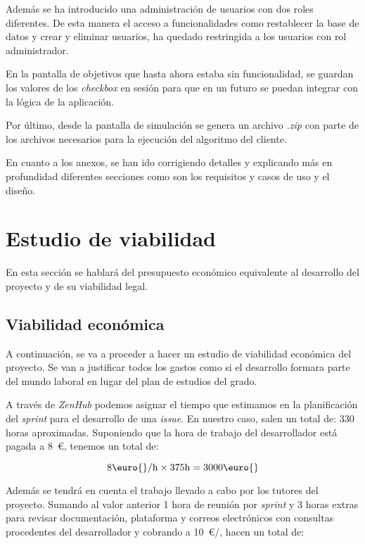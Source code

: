 Además se ha introducido una administración de usuarios con dos roles diferentes. De esta manera el acceso a funcionalidades como restablecer la base de datos y crear y eliminar usuarios, ha quedado restringida a los usuarios con rol administrador.

En la pantalla de objetivos que hasta ahora estaba sin funcionalidad, se guardan los valores de los \textit{checkbox} en sesión para que en un futuro se puedan integrar con la lógica de la aplicación.

Por último, desde la pantalla de simulación se genera un archivo \textit{.zip} con parte de los archivos necesarios para la ejecución del algoritmo del cliente.

En cuanto a los anexos, se han ido corrigiendo detalles y explicando más en profundidad diferentes secciones como son los requisitos y casos de uso y el diseño.

\section{Estudio de viabilidad}

En esta sección se hablará del presupuesto económico equivalente al desarrollo del proyecto y de su viabilidad legal.

\subsection{Viabilidad económica}

A continuación, se va a proceder a hacer un estudio de viabilidad económica del proyecto. Se van a justificar todos los gastos como si el desarrollo formara parte del mundo laboral en lugar del plan de estudios del grado.

A través de \textit{ZenHub} podemos asignar el tiempo que estimamos en la planificación del \textit{sprint} para el desarrollo de una \textit{issue}. En nuestro caso, salen un total de: 330 horas aproximadas. Suponiendo que la hora de trabajo del desarrollador está pagada a 8~\euro{}, tenemos un total de:

\[8\text{\euro{}}/\text{h}\times 375\text{h}=3000\text{\euro{}} \]

Además se tendrá en cuenta el trabajo llevado a cabo por los tutores del proyecto. Sumando al valor anterior 1 hora de reunión por \textit{sprint} y 3 horas extras para revisar documentación, plataforma y correos electrónicos con consultas procedentes del desarrollador y cobrando a 10~\euro{}/, hacen un total de:

